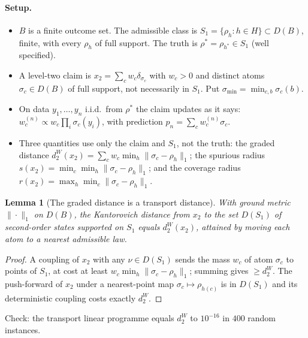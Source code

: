 \documentclass[11pt]{article}
\newtheorem{lemma}[theorem]{Lemma}
\theoremstyle{definition}
\theoremstyle{remark}
\begin{document}
\paragraph{Setup.}
\begin{itemize}
  \item $B$ is a finite outcome set. The admissible class is $S_1=\{\rho_h:h\in H\}\subset D(B)$, finite, with every $\rho_h$ of full support. The truth is $\rho^*=\rho_{h^*}\in S_1$ (well specified).
  \item A level-two claim is $x_2=\sum_cw_c\delta_{\sigma_c}$ with $w_c>0$ and distinct atoms $\sigma_c\in D(B)$ of full support, not necessarily in $S_1$. Put $\sigma_{\min}=\min_{c,b}\sigma_c(b)$.
  \item On data $y_1,\dots,y_n$ i.i.d.\ from $\rho^*$ the claim updates as it says: $w^{(n)}_c\propto w_c\prod_i\sigma_c(y_i)$, with prediction $p_n=\sum_cw^{(n)}_c\sigma_c$.
  \item Three quantities use only the claim and $S_1$, not the truth: the graded distance $d_2^W(x_2)=\sum_cw_c\min_h\|\sigma_c-\rho_h\|_1$; the spurious radius $s(x_2)=\min_c\min_h\|\sigma_c-\rho_h\|_1$; and the coverage radius $r(x_2)=\max_h\min_c\|\sigma_c-\rho_h\|_1$.
\end{itemize}

\begin{lemma}[The graded distance is a transport distance]\label{lem:d2w}
With ground metric $\|\cdot\|_1$ on $D(B)$, the Kantorovich distance from $x_2$ to the set $D(S_1)$ of second-order states supported on $S_1$ equals $d_2^W(x_2)$, attained by moving each atom to a nearest admissible law.
\end{lemma}
\begin{proof}
A coupling of $x_2$ with any $\nu\in D(S_1)$ sends the mass $w_c$ of atom $\sigma_c$ to points of $S_1$, at cost at least $w_c\min_h\|\sigma_c-\rho_h\|_1$; summing gives $\ge d_2^W$. The push-forward of $x_2$ under a nearest-point map $\sigma_c\mapsto\rho_{h(c)}$ is in $D(S_1)$ and its deterministic coupling costs exactly $d_2^W$.
\end{proof}
Check: the transport linear programme equals $d_2^W$ to $10^{-16}$ in $400$ random instances.
\end{document}
